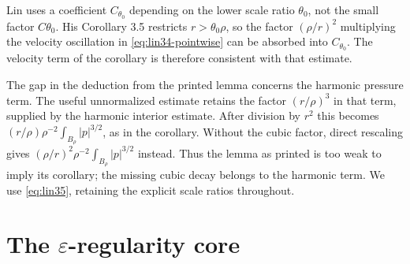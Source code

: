 \documentclass[11pt,reqno]{amsart}
\begin{document}
\begin{remark}\label{rem:lin34-defect}
Lin \cite[Lemma 3.4]{Lin1998} uses a coefficient $C_{\theta_0}$ depending
on the lower scale ratio $\theta_0$, not the small factor $C\theta_0$.
His Corollary 3.5 restricts $r>\theta_0\rho$, so the factor $(\rho/r)^2$
multiplying the velocity oscillation in \eqref{eq:lin34-pointwise} can
be absorbed into $C_{\theta_0}$. The velocity term of the corollary is
therefore consistent with that estimate.

The gap in the deduction from the printed lemma concerns the harmonic
pressure term. The useful unnormalized estimate retains the factor
$(r/\rho)^3$ in that term, supplied by the harmonic interior estimate.
After division by $r^2$ this becomes
$(r/\rho)\rho^{-2}\int_{B_\rho}|p|^{3/2}$, as in the corollary.
Without the cubic factor, direct rescaling gives
$(\rho/r)^2\rho^{-2}\int_{B_\rho}|p|^{3/2}$ instead.
Thus the lemma as printed is too weak to imply its corollary; the
missing cubic decay belongs to the harmonic term. We use
\eqref{eq:lin35}, retaining the explicit scale ratios throughout.
\end{remark}

\section{The \texorpdfstring{$\varepsilon$}{epsilon}-regularity core}\label{sec:core}
\end{document}
